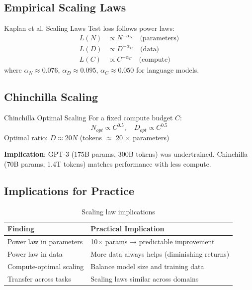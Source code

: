 \subsection{Empirical Scaling Laws}

\begin{mathresult}{Kaplan et al. Scaling Laws}
Test loss follows power laws:
\begin{align}
L(N) &\propto N^{-\alpha_N} \quad \text{(parameters)} \\
L(D) &\propto D^{-\alpha_D} \quad \text{(data)} \\
L(C) &\propto C^{-\alpha_C} \quad \text{(compute)}
\end{align}
where $\alpha_N \approx 0.076$, $\alpha_D \approx 0.095$, $\alpha_C \approx 0.050$ for language models.
\end{mathresult}

\subsection{Chinchilla Scaling}

\begin{mathresult}{Chinchilla Optimal Scaling}
For a fixed compute budget $C$:
\begin{equation}
N_{opt} \propto C^{0.5}, \quad D_{opt} \propto C^{0.5}
\end{equation}
Optimal ratio: $D \approx 20N$ (tokens $\approx$ 20 × parameters)
\end{mathresult}

\textbf{Implication}: GPT-3 (175B params, 300B tokens) was undertrained. Chinchilla (70B params, 1.4T tokens) matches performance with less compute.

\subsection{Implications for Practice}

\begin{table}[H]
\centering
\caption{Scaling law implications}
\begin{tabularx}{\textwidth}{lX}
\toprule
\textbf{Finding} & \textbf{Practical Implication} \\
\midrule
Power law in parameters & 10× params → predictable improvement \\
Power law in data & More data always helps (diminishing returns) \\
Compute-optimal scaling & Balance model size and training data \\
Transfer across tasks & Scaling laws similar across domains \\
\bottomrule
\end{tabularx}
\end{table}

